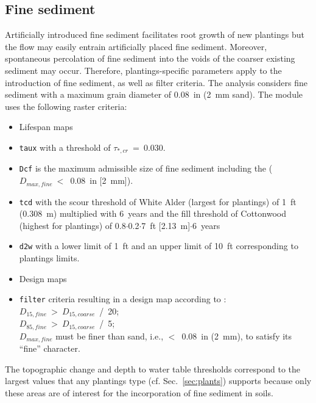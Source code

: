 \subsection{Fine sediment}\label{sec:finesed}
Artificially introduced fine sediment facilitates root growth of new plantings but the flow may easily entrain artificially placed fine sediment. Moreover, spontaneous percolation of fine sediment into the voids of the coarser existing sediment may occur. Therefore, plantings-specific parameters apply to the introduction of fine sediment, as well as filter criteria. The analysis considers fine sediment with a maximum grain diameter of 0.08~in (2~mm sand). The  module uses the following raster criteria:

\begin{itemize}
	\item[] Lifespan maps
	\item \texttt{taux} with a threshold of $\tau_{*,cr}$~=~0.030.
	\item \texttt{Dcf} is the maximum admissible size of fine sediment including the ($D_{max, fine}~<$~0.08~in [2~mm]).
	\item \texttt{tcd} with the scour threshold of White Alder (largest for plantings) of 1~ft (0.308~m) multiplied with 6~years and the fill threshold of Cottonwood (highest for plantings) of 0.8$\cdot$0.2$\cdot$7~ft [2.13~m]$\cdot$6~years
	\item \texttt{d2w} with a lower limit of 1~ft and an upper limit of 10~ft corresponding to plantings limits.
	\item[] Design maps
	\item \texttt{filter} criteria resulting in a design map according to \citep{usace00}:\\
			$D_{15, fine}~>~D_{15, coarse}$~/~20;\\
			$D_{85, fine}~>~D_{15, coarse}$~/~5;\\
			$D_{max, fine}$ must be finer than sand, i.e., $<$~0.08~in (2~mm), to satisfy its ``fine'' character.
\end{itemize}

The topographic change and depth to water table thresholds correspond to the largest values that any plantings type (cf. Sec.~\ref{sec:plants}) supports because only these areas are of interest for the incorporation of fine sediment in soils.

